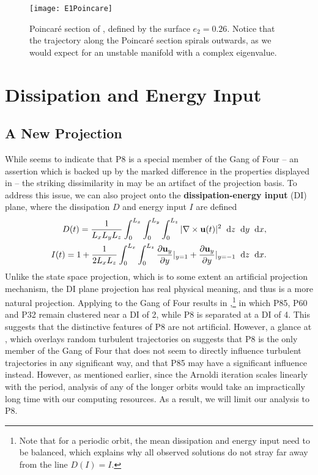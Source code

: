 \begin{figure}[h!]
\centerline{\texttt{[image: E1Poincare]}}
\caption{Poincar\'e section of , defined by the surface $e_2 = 0.26$. Notice that the trajectory along the Poincar\'e section spirals outwards, as we would expect for an unstable manifold with a complex eigenvalue.}\label{fig:E1Poincare}
\end{figure}

\section{Dissipation and Energy Input} \label{sec:DI}
  
\subsection{A New Projection}
While  seems to indicate that P8 is a special member of the Gang of Four -- an assertion which is backed up by the marked difference in the properties displayed in  -- the striking dissimilarity in  may be an artifact of the projection basis. To address this issue, we can also project onto the {\bf dissipation-energy input} (DI) plane, where the dissipation $D$ and energy input $I$ are defined
\begin{align}
D(t) = \frac{1}{L_xL_yL_z}\int{0}{L_x}{\int{0}{L_y}{\int{0}{L_z}{|\nabla\times\Vector{u}(t)|^2}{\textrm{d}z}}{\textrm{d}y}}{\textrm{d}x},\label{eq:diss}\\
I(t)  = 1 + \frac{1}{2L_xL_z}\int{0}{L_x}{\int{0}{L_z}{\pder{1}{\Vector{u}_{y}}{y} |_{y=1}+\pder{1}{\Vector{u}_{y}}{y} |_{y=-1}}{\textrm{d}z}}{\textrm{d}x}.\label{eq:einp}
\end{align} 
Unlike the state space projection, which is to some extent an artificial projection mechanism, the DI plane projection has real physical meaning, and thus is a more natural projection. Applying  to the Gang of Four results in ,\footnote{Note that for a periodic orbit, the mean dissipation and energy input need to be balanced, which explains why all observed solutions do not stray far away from the line $D(I) = I$.} in which P85, P60 and P32 remain clustered near a DI of 2, while P8 is separated at a DI of 4. This suggests that the distinctive features of P8 are not artificial. However, a glance at , which overlays random turbulent trajectories on  suggests that P8 is the only member of the Gang of Four that does not seem to directly influence turbulent trajectories in any significant way, and that P85 may have a significant influence instead. However, as mentioned earlier, since the Arnoldi iteration scales linearly with the period, analysis of any of the longer orbits would take an impractically long time with our computing resources. As a result, we will limit our analysis to P8.   
